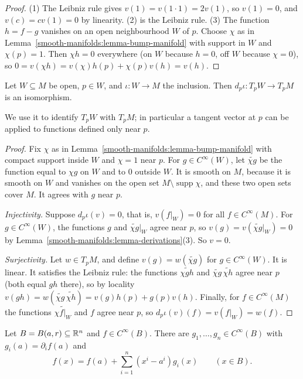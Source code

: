 \begin{proof}
(1) The Leibniz rule gives $v(1) = v(1 \cdot 1) = 2v(1)$, so $v(1) = 0$, and $v(c) = cv(1) = 0$ by linearity. (2) is the Leibniz rule. (3) The function
$h = f - g$ vanishes on an open neighbourhood $W$ of $p$. Choose $\chi$ as in Lemma~\ref{smooth-manifolds:lemma-bump-manifold} with support in $W$ and
$\chi(p) = 1$. Then $\chi h = 0$ everywhere (on $W$ because $h = 0$, off $W$ because $\chi = 0$), so
$0 = v(\chi h) = v(\chi)h(p) + \chi(p)v(h) = v(h)$.
\end{proof}

\begin{proposition}\label{smooth-manifolds:proposition-tangent-open}
Let $W \subseteq M$ be open, $p \in W$, and $\iota \colon W \to M$ the inclusion. Then $d_p\iota \colon T_pW \to T_pM$ is an isomorphism.
\end{proposition}

We use it to identify $T_pW$ with $T_pM$; in particular a tangent vector at $p$ can be applied to functions defined only near $p$.

\begin{proof}
Fix $\chi$ as in Lemma~\ref{smooth-manifolds:lemma-bump-manifold} with compact support inside $W$ and $\chi = 1$ near $p$. For $g \in C^\infty(W)$, let
$\widetilde{\chi g}$ be the function equal to $\chi g$ on $W$ and to $0$ outside $W$. It is smooth on $M$, because it is smooth on $W$ and vanishes on the open
set $M \setminus \operatorname{supp}\chi$, and these two open sets cover $M$. It agrees with $g$ near $p$.

\emph{Injectivity.} Suppose $d_p\iota(v) = 0$, that is, $v(f|_W) = 0$ for all $f \in C^\infty(M)$. For $g \in C^\infty(W)$, the functions $g$ and
$\widetilde{\chi g}|_W$ agree near $p$, so $v(g) = v(\widetilde{\chi g}|_W) = 0$ by Lemma~\ref{smooth-manifolds:lemma-derivations}(3). So $v = 0$.

\emph{Surjectivity.} Let $w \in T_pM$, and define $v(g) = w(\widetilde{\chi g})$ for $g \in C^\infty(W)$. It is linear. It satisfies the Leibniz rule: the
functions $\widetilde{\chi gh}$ and $\widetilde{\chi g}\,\widetilde{\chi h}$ agree near $p$ (both equal $gh$ there), so by locality
$v(gh) = w(\widetilde{\chi g}\,\widetilde{\chi h}) = v(g)h(p) + g(p)v(h)$. Finally, for $f \in C^\infty(M)$ the functions $\widetilde{\chi f|_W}$ and $f$ agree
near $p$, so $d_p\iota(v)(f) = v(f|_W) = w(f)$.
\end{proof}

\begin{lemma}[Hadamard]\label{smooth-manifolds:lemma-hadamard}
Let $B = B(a, r) \subseteq \mathbb{R}^n$ and $f \in C^\infty(B)$. There are $g_1, \ldots, g_n \in C^\infty(B)$ with $g_i(a) = \partial_if(a)$ and
\[
f(x) = f(a) + \sum_{i=1}^n(x^i - a^i)g_i(x) \qquad (x \in B).
\]
\end{lemma}

